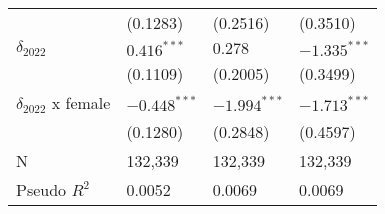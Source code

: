 \begin{tabular}{llll}
                           &           (0.1283) &           (0.2516) &           (0.3510) \\
$\delta_{2022}$            &      $0.416^{***}$ &            $0.278$ &     $-1.335^{***}$ \\
                           &           (0.1109) &           (0.2005) &           (0.3499) \\
$\delta_{2022}$ x female   &     $-0.448^{***}$ &     $-1.994^{***}$ &     $-1.713^{***}$ \\
                           &           (0.1280) &           (0.2848) &           (0.4597) \\
N                          &            132,339 &            132,339 &            132,339 \\
Pseudo $R^2$               &             0.0052 &             0.0069 &             0.0069 \\
\bottomrule
\end{tabular}
